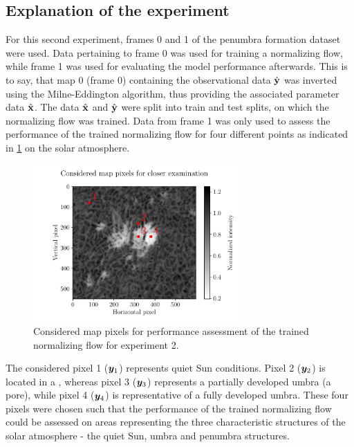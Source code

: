 \documentclass[a4paper,12pt]{report}
\def\lk#1{{\color{black}{#1}}}
\begin{document}
\subsection{Explanation of the experiment}
For this second experiment, frames 0 and 1 of the penumbra formation dataset were used. Data pertaining to frame 0 was used for training a normalizing flow, while frame 1 was used for evaluating the model performance afterwards. This is to say, that map 0 (frame 0) containing the observational data $\hat{\boldsymbol{\mathbf{y}}}$ was inverted using the Milne-Eddington algorithm, thus providing the associated parameter data $\hat{\boldsymbol{\mathbf{x}}}$. The data $\hat{\boldsymbol{\mathbf{x}}}$ and $\hat{\boldsymbol{\mathbf{y}}}$ were split into train and test splits, on which the normalizing flow was trained. Data from frame 1 was only used to assess the performance of the trained normalizing flow for four different points as indicated in \cref{fig:nf-milne-eddington-example-6-considered-map-pixels-nflows-piecewisequadratic} on the solar atmosphere.
\begin{figure}[h!]
\centering
\includegraphics[width=8cm]{figures/nf-milne-eddington-example-6-considered-map-pixels-nflows-piecewisequadratic.pdf}
\caption{Considered map pixels for performance assessment of the trained normalizing flow for experiment 2.}
\label{fig:nf-milne-eddington-example-6-considered-map-pixels-nflows-piecewisequadratic}
\end{figure}
The considered pixel 1 ($\bm{y}_1$) represents quiet Sun conditions. Pixel 2 ($\bm{y}_2$) is located in a \lk{penumbra-developing area}, whereas pixel 3 ($\bm{y}_3$) represents a partially developed umbra (a pore), while pixel 4 ($\bm{y}_4$) is representative of a fully developed umbra. These four pixels were chosen such that the performance of the trained normalizing flow could be assessed on areas representing the three characteristic structures of the solar atmosphere - the quiet Sun, umbra and penumbra structures.
\end{document}
